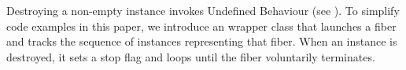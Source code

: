 \newpage
{}\label{launch}\label{appendixa}

Destroying a non-empty \fiber instance invokes Undefined Behaviour
(see ). To simplify code examples in this paper, we
introduce an  wrapper class that launches a fiber and tracks
the sequence of \fiber instances representing that fiber. When
an  instance is destroyed, it sets a stop flag and loops until
the fiber voluntarily terminates.


